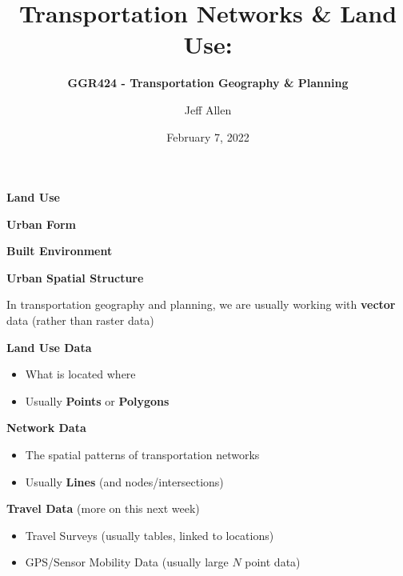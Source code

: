\documentclass[aspectratio=169]{beamer}
\title{\textbf{Transportation Networks \& Land Use:}}
\subtitle{\textbf{GGR424 - Transportation Geography \& Planning}}
\author{Jeff Allen}
\institute{University of Toronto}
\date{February 7, 2022}
\begin{document}
	
\begin{frame}
	\titlepage	
\end{frame}



\begin{frame}
	
	\textbf{Land Use}
	
	\textbf{Urban Form}
	
	\textbf{Built Environment}
	
	\textbf{Urban Spatial Structure}
	
\end{frame}





\begin{frame}
	
	In transportation geography and planning, we are usually working with \textbf{vector} data (rather than raster data)
	
	\vspace{2mm}
	
	\textbf{Land Use Data}
	
	\begin{itemize}
		\item What is located where
		\item Usually \textbf{Points} or \textbf{Polygons}
	\end{itemize}

	\vspace{2mm}
	
	\textbf{Network Data}
	
	\begin{itemize}
		\item The spatial patterns of transportation networks 
		\item Usually \textbf{Lines} (and nodes/intersections)
	\end{itemize}

	\vspace{2mm}

	\textbf{Travel Data} (more on this next week)
	
	\begin{itemize}
		
		\item Travel Surveys (usually tables, linked to locations)
		\item GPS/Sensor Mobility Data (usually large $N$ point data)

	\end{itemize}
		
\end{frame}
\end{document}
